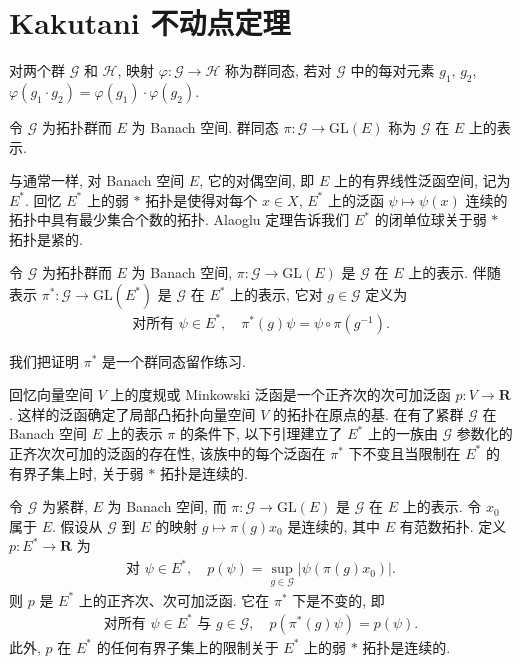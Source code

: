 \documentclass[../../main.tex]{subfiles}
\begin{document}
\section{Kakutani 不动点定理}\label{section:ch22-kakutani}

对两个群 $\mathcal{G}$ 和 $\mathcal{H}$, 映射 $\varphi:\mathcal{G}\to\mathcal{H}$ 称为群同态, 若对 $\mathcal{G}$ 中的每对元素 $g_{1}$, $g_{2}$, $\varphi(g_{1}\cdot g_{2})=\varphi(g_{1})\cdot\varphi(g_{2})$.

\begin{definition}[表示]\label{definition:ch22-representation}
令 $\mathcal{G}$ 为拓扑群而 $E$ 为 Banach 空间. 群同态 $\pi:\mathcal{G}\to\mathrm{GL}(E)$ 称为 $\mathcal{G}$ 在 $E$ 上的表示.
\end{definition}

与通常一样, 对 Banach 空间 $E$, 它的对偶空间, 即 $E$ 上的有界线性泛函空间, 记为 $E^{*}$. 回忆 $E^{*}$ 上的弱 $*$ 拓扑是使得对每个 $x\in X$, $E^{*}$ 上的泛函 $\psi\mapsto\psi(x)$ 连续的拓扑中具有最少集合个数的拓扑. Alaoglu 定理告诉我们 $E^{*}$ 的闭单位球关于弱 $*$ 拓扑是紧的.

\begin{definition}[伴随表示]\label{definition:ch22-adjoint-representation}
令 $\mathcal{G}$ 为拓扑群而 $E$ 为 Banach 空间, $\pi:\mathcal{G}\to\mathrm{GL}(E)$ 是 $\mathcal{G}$ 在 $E$ 上的表示. 伴随表示 $\pi^{*}:\mathcal{G}\to\mathrm{GL}(E^{*})$ 是 $\mathcal{G}$ 在 $E^{*}$ 上的表示, 它对 $g\in\mathcal{G}$ 定义为
\begin{align}
\text{对所有 }\psi\in E^{*},\quad\pi^{*}(g)\psi=\psi\circ\pi(g^{-1}).
\label{align:ch22-adjoint-def}
\end{align}
\end{definition}

我们把证明 $\pi^{*}$ 是一个群同态留作练习.

回忆向量空间 $V$ 上的度规或 Minkowski 泛函是一个正齐次的次可加泛函 $p:V\to\mathbf{R}$. 这样的泛函确定了局部凸拓扑向量空间 $V$ 的拓扑在原点的基. 在有了紧群 $\mathcal{G}$ 在 Banach 空间 $E$ 上的表示 $\pi$ 的条件下, 以下引理建立了 $E^{*}$ 上的一族由 $\mathcal{G}$ 参数化的正齐次次可加的泛函的存在性, 该族中的每个泛函在 $\pi^{*}$ 下不变且当限制在 $E^{*}$ 的有界子集上时, 关于弱 $*$ 拓扑是连续的.

\begin{lemma}[不变 Minkowski 泛函]\label{lemma:ch22-invariant-minkowski}
令 $\mathcal{G}$ 为紧群, $E$ 为 Banach 空间, 而 $\pi:\mathcal{G}\to\mathrm{GL}(E)$ 是 $\mathcal{G}$ 在 $E$ 上的表示. 令 $x_{0}$ 属于 $E$. 假设从 $\mathcal{G}$ 到 $E$ 的映射 $g\mapsto\pi(g)x_{0}$ 是连续的, 其中 $E$ 有范数拓扑. 定义 $p:E^{*}\to\mathbf{R}$ 为
\begin{align*}
\text{对 }\psi\in E^{*},\quad p(\psi)=\sup_{g\in\mathcal{G}}|\psi(\pi(g)x_{0})|.
\end{align*}
则 $p$ 是 $E^{*}$ 上的正齐次、次可加泛函. 它在 $\pi^{*}$ 下是不变的, 即
\begin{align*}
\text{对所有 }\psi\in E^{*}\text{ 与 }g\in\mathcal{G},\quad p(\pi^{*}(g)\psi)=p(\psi).
\end{align*}
此外, $p$ 在 $E^{*}$ 的任何有界子集上的限制关于 $E^{*}$ 上的弱 $*$ 拓扑是连续的.
\end{lemma}
\end{document}
